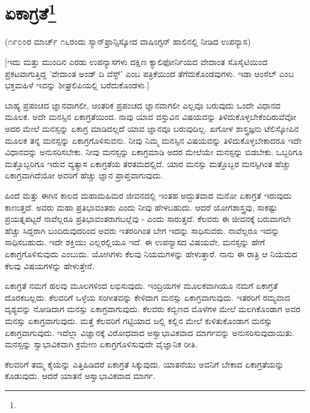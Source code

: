 
\chapter[ಏಕಾಗ್ರತೆ]{ಏಕಾಗ್ರತೆ\protect\footnote{}}

\begin{center}
(೧೯೦೦ರ ಮಾರ್ಚ್ ೧೬ರಂದು ಸ್ಯಾನ್‌ಫ್ರಾನ್ಸಿಸ್ಕೋದ ವಾಷಿಂಗ್ಟನ್ ಹಾಲಿನಲ್ಲಿ ನೀಡಿದ ಉಪನ್ಯಾಸ)
\end{center}

[ಇದು ಮತ್ತು ಮುಂದಿನ ಎರಡು ಉಪನ್ಯಾಸಗಳು ದಕ್ಷಿಣ ಕ್ಯಾಲಿಫೋರ್ನಿಯದ ವೇದಾಂತ ಸೊಸೈಟಿಯಿಂದ ಪ್ರಕಟವಾಗುತ್ತಿದ್ದ 'ವೇದಾಂತ ಅಂಡ್ ದಿ ವೆಸ್ಟ್' ಎಂಬ ಪತ್ರಿಕೆಯಿಂದ ತೆಗೆದುಕೊಂಡವುಗಳು. ಇಡಾ ಆಂಸೆಲ್ ಎಂಬ ಭಕ್ತಮಹಿಳೆ ಇವನ್ನು ಶೀಘ್ರಲಿಪಿಯಲ್ಲಿ ಬರೆದುಕೊಂಡಳು.]

ಬಾಹ್ಯ ಪ್ರಪಂಚದ ಜ್ಞಾನವಾಗಲೀ, ಆಂತರಿಕ ಪ್ರಪಂಚದ ಜ್ಞಾನವಾಗಲೀ ಎಲ್ಲವೂ ಬರುವುದು ಒಂದೇ ವಿಧಾನದ ಮೂಲಕ. ಅದೇ ಮನಸ್ಸಿನ ಏಕಾಗ್ರತೆಯಿಂದ. ನಾವು ಯಾವ ವಸ್ತುವಿನ ವಿಷಯವನ್ನು ತಿಳಿದುಕೊಳ್ಳಬೇಕೆಂದಿರುವೆವೋ ಅದರ ಮೇಲೆ ಮನಸ್ಸನ್ನು ಏಕಾಗ್ರ ಮಾಡಿದಲ್ಲದೆ ಯಾವ ಜ್ಞಾನವೂ ಬರುವುದಿಲ್ಲ. ಖಗೋಳ ಶಾಸ್ತ್ರಜ್ಞನು ಟೆಲಿಸ್ಕೋಪಿನ ಮೂಲಕ ತನ್ನ ಮನಸ್ಸನ್ನು ಏಕಾಗ್ರಗೊಳಿಸುವನು. ನೀವು ನಿಮ್ಮ ಮನಸ್ಸಿನ ವಿಷಯವನ್ನು ತಿಳಿದುಕೊಳ್ಳಬೇಕಾದರೂ ಇದೇ ವಿಧಾನವನ್ನು ಅನುಸರಿಸಬೇಕು. ನೀವು ಮನಸ್ಸನ್ನು ಏಕಾಗ್ರಮಾಡಿ ಅದರ ಮೇಲೆಯೇ ಮನಸ್ಸನ್ನು ಬಿಡಬೇಕು. ಒಬ್ಬರಿಗೂ ಮತ್ತೊಬ್ಬರಿಗೂ ಇರುವ ವ್ಯತ್ಯಾಸ ಏಕಾಗ್ರತೆಯ ತರತಮದಲ್ಲಿದೆ. ಯಾರ ಮನಸ್ಸು ಮತ್ತೊಬ್ಬರ ಮನಸ್ಸಿಗಿಂತ ಹೆಚ್ಚು ಏಕಾಗ್ರವಾಗಿದೆಯೋ ಅವರಿಗೆ ಹೆಚ್ಚು ಜ್ಞಾನ ಪ್ರಾಪ್ತವಾಗುವುದು.

ಹಿಂದೆ ಮತ್ತು ಈಗಿನ ಕಾಲದ ಮಹಾಮಹಿಮರ ಜೀವನದಲ್ಲಿ ಇಂತಹ ಅದ್ಭುತವಾದ ಮನೋ ಏಕಾಗ್ರತೆ ಇರುವುದು ಕಾಣುತ್ತದೆ. ಅವರು ಮಹಾ ಪ್ರತಿಭಾವಂತರು ಎಂದು ನೀವು ಹೇಳಬಹುದು. ಆದರೆ ಯೋಗಶಾಸ್ತ್ರವು, ಸಾಕಷ್ಟು ಪ್ರಯತ್ನಪಟ್ಟರೆ ನಾವೆಲ್ಲರೂ ಪ್ರತಿಭಾವಂತರಾಗಬಲ್ಲೆವು - ಎಂದು ಸಾರುತ್ತದೆ. ಕೆಲವರು ಈ ಜೀವನಕ್ಕೆ ಬರುವಾಗಲೇ ಹೆಚ್ಚು ಸಿದ್ದರಾಗಿ ಬಂದಿರುವುದರಿಂದ ಅವರು ಇತರರಿಗಿಂತ ಬೇಗ ಇದನ್ನು ಸಾಧಿಸುವರು. ನಾವೆಲ್ಲರೂ ಇದನ್ನು ಸಾಧಿಸಬಹುದು. ಇದೇ ಶಕ್ತಿಯು ಎಲ್ಲರಲ್ಲಿಯೂ ಇದೆ. ಈ ಉಪನ್ಯಾಸದ ವಿಷಯವೇ, ಮನಸ್ಸನ್ನು ಹೇಗೆ ಏಕಾಗ್ರಗೊಳಿಸುವುದು ಎಂಬುದು. ಯೋಗಿಗಳು ಕೆಲವು ನಿಯಮಗಳನ್ನು ಹೇಳುತ್ತಾರೆ. ನಾನು ಈ ರಾತ್ರಿ ಆ ನಿಯಮದ ಕೆಲವು ವಿಷಯಗಳನ್ನು ಹೇಳುತ್ತೇನೆ.

ಏಕಾಗ್ರತೆ ನಮಗೆ ಹಲವು ಮೂಲಗಳಿಂದ ಲಭಿಸುವುದು. ಇಂದ್ರಿಯಗಳ ಮೂಲಕವಾಗಿಯೂ ನಮಗೆ ಏಕಾಗ್ರತೆ ದೊರಕಬಲ್ಲದು. ಕೆಲವರಿಗೆ ಒಳ್ಳೆಯ ಸಂಗೀತವನ್ನು ಕೇಳಿದಾಗ ಮನಸ್ಸು ಏಕಾಗ್ರವಾಗುವುದು. ಇತರರಿಗೆ ರಮ್ಯವಾದ ದೃಶ್ಯವನ್ನು ನೋಡಿದಾಗ ಮನಸ್ಸು ಏಕಾಗ್ರವಾಗುವುದು. ಕೆಲವರು ಕಬ್ಬಿಣದ ಮೊಳೆಗಳ ಮೇಲೆ ಮಲಗಿಕೊಂಡಾಗ ಅವರ ಮನಸ್ಸು ಏಕಾಗ್ರವಾಗುವುದು. ಮತ್ತೆ ಕೆಲವರಿಗೆ ಗಟ್ಟಿಯಾದ ಜಲ್ಲಿ ಕಲ್ಲಿನ ಮೇಲೆ ಕುಳಿತುಕೊಂಡಾಗ ಮನಸ್ಸು ಏಕಾಗ್ರವಾಗುವುದು. ಇದೆಲ್ಲಾ ವಿಜ್ಞಾನಕ್ಕೆ ವಿರೋಧವಾದ ಅಸ್ವಾಭಾವಿಕವಾದ ಮಾರ್ಗವನ್ನು ಅನುಸರಿಸುವುದಾಯಿತು. ಮನಸ್ಸನ್ನು ಸ್ವಾಭಾವಿಕವಾಗಿ ಕ್ರಮೇಣ ಏಕಾಗ್ರಗೊಳಿಸುವುದೇ ವೈಜ್ಞಾನಿಕ ರೀತಿ.

ಕೆಲವರಿಗೆ ತಮ್ಮ ಕೈಯನ್ನು ಎತ್ತಿಹಿಡಿದರೆ ಏಕಾಗ್ರತೆ ಸಿಕ್ಕುವುದು. ಯಾತನೆಯು ಅವನಿಗೆ ಬೇಕಾದ ಏಕಾಗ್ರತೆಯನ್ನು ಕೊಡುವುದು. ಆದರೆ ಯಾತನೆ ಅಸ್ವಾಭಾವಿಕವಾದ ಮಾರ್ಗ.

